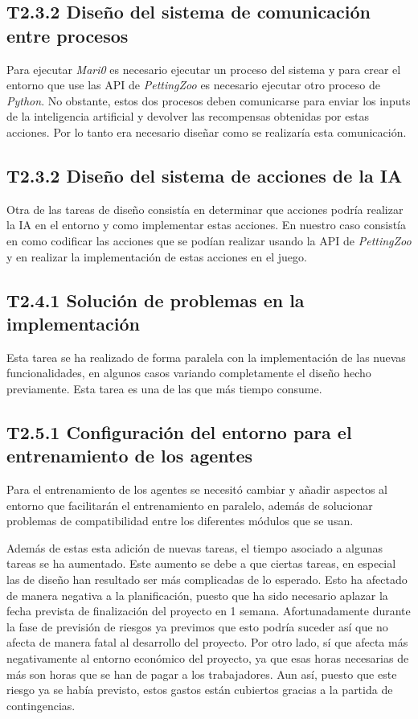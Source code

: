 \subsection*{T2.3.2 Diseño del sistema de comunicación entre procesos}
Para ejecutar \textit{Mari0} es necesario ejecutar un proceso del sistema y para crear el entorno que use las API de \textit{PettingZoo} es necesario ejecutar otro proceso de \textit{Python}. No obstante, estos dos procesos deben comunicarse para enviar los inputs de la inteligencia artificial y devolver las recompensas obtenidas por estas acciones. Por lo tanto era necesario diseñar como se realizaría esta comunicación.

\subsection*{T2.3.2 Diseño del sistema de acciones de la IA}
Otra de las tareas de diseño consistía en determinar que acciones podría realizar la IA en el entorno y como implementar estas acciones. En nuestro caso consistía en como codificar las acciones que se podían realizar usando la API de \textit{PettingZoo} y en realizar la implementación de estas acciones en el juego.

\subsection*{T2.4.1 Solución de problemas en la implementación}
Esta tarea se ha realizado de forma paralela con la implementación de las nuevas funcionalidades, en algunos casos variando completamente el diseño hecho previamente. Esta tarea es una de las que más tiempo consume.

\subsection*{T2.5.1 Configuración del entorno para el entrenamiento de los agentes}
Para el entrenamiento de los agentes se necesitó cambiar y añadir aspectos al entorno que facilitarán el entrenamiento en paralelo, además de solucionar problemas de compatibilidad entre los diferentes módulos que se usan.

Además de estas esta adición de nuevas tareas, el tiempo asociado a algunas tareas se ha aumentado. Este aumento se debe a que ciertas tareas, en especial las de diseño han resultado ser más complicadas de lo esperado. Esto ha afectado de manera negativa a la planificación, puesto que ha sido necesario aplazar la fecha prevista de finalización del proyecto en 1 semana. Afortunadamente durante la fase de previsión de riesgos ya previmos que esto podría suceder así que no afecta de manera fatal al desarrollo del proyecto. Por otro lado, sí que afecta más negativamente al entorno económico del proyecto, ya que esas horas necesarias de más son horas que se han de pagar a los trabajadores. Aun así, puesto que este riesgo ya se había previsto, estos gastos están cubiertos gracias a la partida de contingencias.

